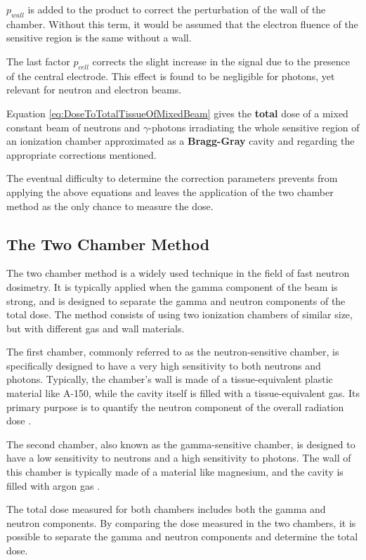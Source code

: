 $p_{wall}$ is added to the product to correct the perturbation of the wall of the chamber. Without this term, it would be assumed that the electron fluence of the sensitive region is the same without a wall.

The last factor $p_{cell}$ corrects the slight increase in the signal due to the presence of the central electrode. This effect is found to be negligible for photons, yet relevant for neutron and electron beams. 

Equation \ref{eq:DoseToTotalTissueOfMixedBeam} gives the \textbf{total} dose of a mixed constant beam of neutrons and $\gamma$-photons irradiating the whole sensitive region of an ionization chamber approximated as a \textbf{Bragg-Gray} cavity and regarding the appropriate corrections mentioned.

The eventual difficulty to determine the correction parameters prevents from applying the above equations and leaves the application of the two chamber method as the only chance to measure the dose.


\subsection{The Two Chamber Method}

The two chamber method is a widely used technique in the field of fast neutron dosimetry. It is typically applied when the gamma component of the beam is strong, and is designed to separate the gamma and neutron components of the total dose. The method consists of using two ionization chambers of similar size, but with different gas and wall materials.

The first chamber, commonly referred to as the neutron-sensitive chamber, is specifically designed to have a very high sensitivity to both neutrons and photons. Typically, the chamber's wall is made of a tissue-equivalent plastic material like A-150, while the cavity itself is filled with a tissue-equivalent gas. Its primary purpose is to quantify the neutron component of the overall radiation dose \cite{RadiationOncologyInPhysicsHandbook}.

The second chamber, also known as the gamma-sensitive chamber, is designed to have a low sensitivity to neutrons and a high sensitivity to photons. The wall of this chamber is typically made of a material like magnesium, and the cavity is filled with argon gas \cite{RadiationOncologyInPhysicsHandbook}.

The total dose measured for both chambers includes both the gamma and neutron components. By comparing the dose measured in the two chambers, it is possible to separate the gamma and neutron components and determine the total dose.

